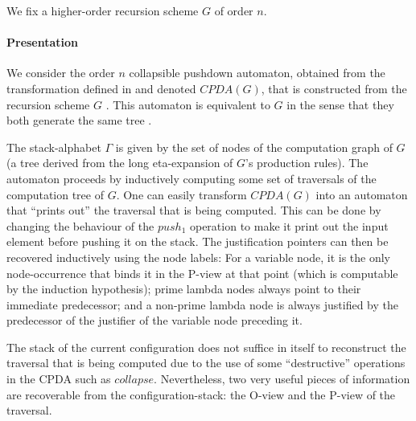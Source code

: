 \documentclass[a4paper]{article}[12pt]
\theoremstyle{remark}
\theoremstyle{definition}
\begin{document}
We fix a higher-order recursion scheme $G$ of order $n$.

\paragraph{Presentation}
We consider the order $n$ collapsible pushdown automaton, obtained from the transformation defined in \cite{hmos-lics08} and denoted $CPDA(G)$, that is constructed from the recursion scheme $G$ \cite[Definition 5.2]{hague-collaps-full}. This automaton is equivalent to $G$ in the sense that they both generate the same tree \cite{hmos-lics08}.

The stack-alphabet $\Gamma$ is given by the set of nodes of the computation graph of $G$ (a tree derived from the long eta-expansion of $G$'s production rules). The automaton proceeds by inductively computing some set of traversals of the computation tree of $G$. One can easily transform $CPDA(G)$ into an automaton that ``prints out'' the traversal that is being computed. This can be done by changing the behaviour of the $push_1$ operation to make it print out the input element before pushing it on the stack. The justification pointers can then be recovered inductively using the node labels: For a variable node, it is the only node-occurrence that binds it in the P-view at that point (which is computable by the induction hypothesis); prime lambda nodes always point to their immediate predecessor; and a non-prime lambda node is always justified by the predecessor of the justifier of the variable node preceding it.

The stack of the current configuration does not suffice in itself to reconstruct the traversal that is being computed
due to the use of some ``destructive'' operations in the CPDA such as $collapse$. Nevertheless, two very useful pieces of information are recoverable from the configuration-stack: the O-view and the P-view of the traversal.
\end{document}
